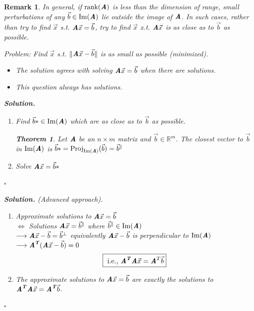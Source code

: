 \documentclass[12pt, a4paper]{article}
\newtheorem{thm}{Theorem}[subsection]
\newenvironment*{sol}{\indent\textbf{Solution. }}{\hfill{$\square$}\par}
\newtheorem*{rmk}{\indent Remark}
\def\R{{\mathbb{R}}}
\def\T{{\textbf{\emph{T}}}}
\def\IM{{\mathrm{Im}}}
\def\rank{\mathrm{rank}}
\def\Proj{\mathrm{Proj}}
\def\vecx{\vec{x}}
\def\vecb{\vec{b}}
\def\matrixA{\textbf{\emph{A}}}
\begin{document}
\begin{rmk}
	In general, if $\rank(\matrixA)$ is less than the dimension of range, small perturbations of any $\vecb\in\IM(\matrixA)$ lie outside the image of $\matrixA$. In such cases, rather than try to find $\vecx$ \emph{s.t.} $\matrixA\vecx=\vecb$, try to find $\vecx$ \emph{x.t.} $\matrixA\vecx$ is as close as to $\vecb$ as possible. 	
	\begin{tcolorbox}
		Problem: Find $\vecx$ \emph{s.t.} $\|\matrixA\vecx-\vecb\|$ is as small as possible (minimized).
		\begin{itemize}
			\item The solution agrees with solving $\matrixA\vecx=\vecb$ when there are solutions.
			\item This question always has solutions.
		\end{itemize}	
	\end{tcolorbox}
	\begin{sol}
		\begin{enumerate}
			\item Find $\vecb*\in\IM(\matrixA)$ which are as close as to $\vecb$ as possible. \\
			\begin{thm} Let $\matrixA$ be an $n\times m$ matrix and $\vecb\in\R^m$. The closest vector to $\vecb$ in $\IM(\matrixA)$ is $\vecb*=\Proj_{\IM(\matrixA)}(\vecb)=\vecb^\parallel$ \end{thm}
			\item Solve $\matrixA\vecx=\vecb*$
		\end{enumerate}
	\end{sol}
	\begin{sol}(Advanced approach).
		\begin{enumerate}
			\item Approximate solutions to 	$\matrixA\vecx=\vecb$\\$\Longleftrightarrow$ Solutions $\matrixA\vecx=\vecb^\parallel$ where $\vecb^\parallel\in\IM(\matrixA)$\\$\longrightarrow\matrixA\vecx-\vecb=\vecb^\perp$ equivalently $\matrixA\vecx-\vecb$ is perpendicular to $\IM(\matrixA)$\\$\longrightarrow\matrixA^\T(\matrixA\vecx-\vecb)=0$\[\boxed{\text{ i.e., }\matrixA^\T\matrixA\vecx=\matrixA^T\vecb}\]
			\item The approximate solutions to $\matrixA\vecx=\vecb$ are exactly the solutions to $\matrixA^\T\matrixA\vecx=\matrixA^\T\vecb$.
		\end{enumerate}
	\end{sol}

\end{rmk}
\end{document}
